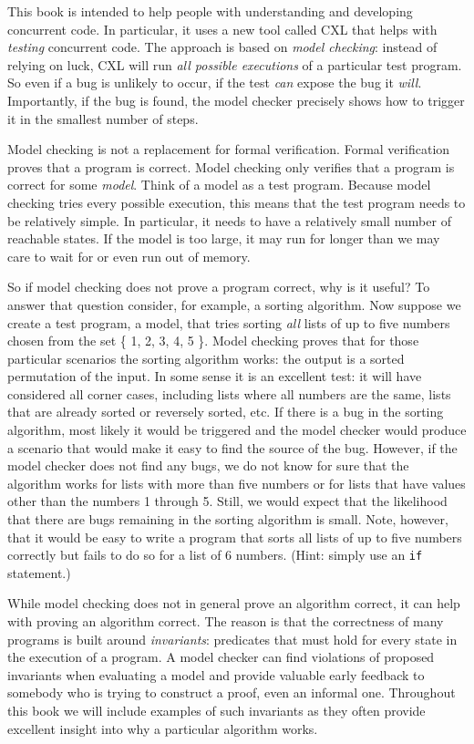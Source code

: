 \documentclass{report}
\begin{document}
This book is intended to help people with understanding and
developing concurrent code.  In particular, it uses a new tool
called CXL that helps with \emph{testing} concurrent code.
The approach is based on \emph{model checking}: instead of relying
on luck, CXL will run \emph{all possible executions} of a particular
test program.  So even if a bug is unlikely to occur, if the test
\emph{can} expose the bug it \emph{will}.  Importantly, if the bug is
found, the model checker precisely shows how to trigger it in
the smallest number of steps.

Model checking is not a replacement for formal verification.  Formal
verification proves that a program is correct.  Model checking only
verifies that a program is correct for some \emph{model}.  Think of
a model as a test program.  Because model checking tries every possible
execution, this means that the test program needs to be relatively
simple.  In particular, it needs to have a relatively small number of
reachable states.
If the model is too large, it may run for longer than we may care to
wait for or even run out of memory.

So if model checking does not prove a program correct, why is it
useful?  To answer that question consider, for example, a sorting
algorithm.
Now suppose we create a test program, a model, that tries sorting
\emph{all} lists of up to five numbers chosen from the set \{ 1,
2, 3, 4, 5 \}.  Model checking proves that for those particular
scenarios the sorting algorithm works: the output is a sorted
permutation of the input.  In some sense it is an excellent test:
it will have considered all corner cases, including lists where all
numbers are the same, lists that are already sorted or reversely
sorted, etc.  If there is a bug in the sorting algorithm, most
likely it would be triggered and the model checker would produce a
scenario that would make it easy to find the source of the bug.
However, if the model checker does not find any bugs, we do not
know for sure that the algorithm works for lists with more than
five numbers or for lists that have values other than the numbers
1 through 5.  Still, we would expect that the likelihood that there
are bugs remaining in the sorting algorithm is small.
Note, however, that it would be easy to write a program
that sorts all lists of up to five numbers correctly but fails to
do so for a list of 6 numbers.  (Hint: simply use an \texttt{if}
statement.)

While model checking does not in general prove an algorithm correct,
it can help with proving an algorithm correct.
The reason is that the correctness of many programs is built around
\emph{invariants}: predicates that must hold for every state in the
execution of a program.  A model checker can find violations of
proposed invariants when evaluating a model and provide valuable early
feedback to somebody who is trying to construct a proof, even an
informal one.
Throughout this book we will include examples
of such invariants as they often provide excellent insight into
why a particular algorithm works.
\end{document}

